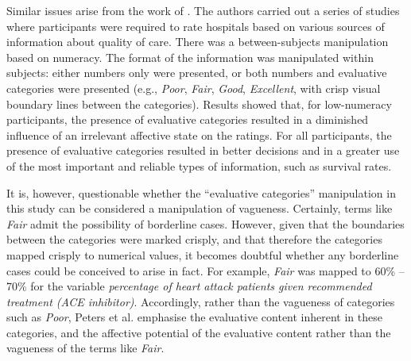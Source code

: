 Similar issues arise from the work of \citet{peters2009bringing}. The authors carried out a series of studies where participants were required to rate hospitals based on various sources of information about quality of care. There was a between-subjects manipulation based on numeracy. The format of the information was manipulated within subjects: either numbers only were presented, or both numbers and evaluative categories were presented (e.g., \emph{Poor}, \emph{Fair}, \emph{Good}, \emph{Excellent}, with crisp visual boundary lines between the categories). Results showed that, for low-numeracy participants, the presence of evaluative categories resulted in a diminished influence of an irrelevant affective state on the ratings. For all participants, the presence of evaluative categories resulted in better decisions and in a greater use of the most important and reliable types of information, such as survival rates. 

It is, however, questionable whether the ``evaluative categories'' manipulation in this study can be considered a manipulation of vagueness. Certainly, terms like \emph{Fair} admit the possibility of borderline cases. However, given that the boundaries between the categories were marked crisply, and that therefore the categories mapped crisply to numerical values, it becomes doubtful whether any borderline cases could be conceived to arise in fact. For example, \emph{Fair} was mapped to 60\% -- 70\% for the variable \emph{percentage of heart attack patients given recommended treatment (ACE inhibitor)}. Accordingly, rather than the vagueness of categories such as \emph{Poor}, Peters et al. emphasise the evaluative content inherent in these categories, and the affective potential of the evaluative content rather than the vagueness of the terms like {\em Fair}.
